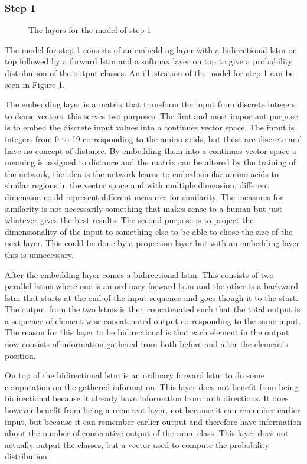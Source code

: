 \subsubsection{Step 1}

\begin{figure}
	\centering
	\caption{The layers for the model of step 1}
	\label{fig:step1}
\end{figure}

The model for step 1 consists of an embedding layer with a bidirectional \gls{lstm} on top followed by a
forward \gls{lstm} and a softmax layer on top to give a probability distribution of the output classes.
An illustration of the model for step 1 can be seen in Figure \ref{fig:step1}.

The embedding layer is a matrix that transform the input from discrete integers to dense vectors, 
this serves two purposes. The first and most important purpose is to embed the discrete input values 
into a continues vector space. The input is integers from 0 to 19 corresponding to the amino acids, but 
these are discrete and have no concept of distance. By embedding them into a continues vector space 
a meaning is assigned to distance and the matrix can be altered by the training of the network, 
the idea is the network learns to embed similar amino acids to similar regions in the vector space
and with multiple dimension, different dimension could represent different measures for similarity. 
The measures for similarity is not necessarily something that makes sense to a human but just whatever 
gives the best results. The second purpose is to project the dimensionality of the input to something else 
to be able to chose the size of the next layer. This could be done by a projection layer but with an embedding 
layer this is unnecessary. 

After the embedding layer comes a bidirectional \gls{lstm}. This consists of two parallel \glspl{lstm} where 
one is an ordinary forward \gls{lstm} and the other is a backward \gls{lstm} that starts at the end of the 
input sequence and goes though it to the start. The output from the two \glspl{lstm} is then concatenated
such that the total output is a sequence of element wise concatenated output corresponding to the same input.
The reason for this layer to be bidirectional is that each element in the output now consists of information
gathered from both before and after the element's position. 

On top of the bidirectional \gls{lstm} is an ordinary forward \gls{lstm} to do some computation on the
gathered information. This layer does not benefit from being bidirectional because it already have 
information from both directions. It does however benefit from being a recurrent layer, not 
because it can remember earlier input, but because it can remember earlier output and therefore have
information about the number of consecutive output of the same class. This layer does not actually 
output the classes, but a vector used to compute the probability distribution.

